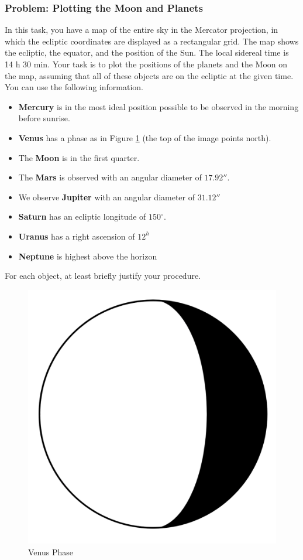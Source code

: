 \documentclass[a4paper,12pt]{extarticle}
\begin{document}
\subsubsection{Problem: Plotting the Moon and Planets}
\begin{multicols}{2}
	
In this task, you have a map of the entire sky in the Mercator projection, in which the ecliptic coordinates are displayed as a rectangular grid. The map shows the ecliptic, the equator, and the position of the Sun. The local sidereal time is 14 h 30 min. Your task is to plot the positions of the planets and the Moon on the map, assuming that all of these objects are on the ecliptic at the given time. You can use the following information.
	
	\begin{itemize}
		\itemsep0em 
		\item \textbf{Mercury} is in the most ideal position possible to be observed in the morning before sunrise.
		\item \textbf{Venus} has a phase as in Figure \ref{venus1} (the top of the image points north).
		\item The \textbf{Moon} is in the first quarter.
		\item The \textbf{Mars} is observed with an angular diameter of $17.92''$.
		\item We observe \textbf{Jupiter} with an angular diameter of $31.12''$
		\item \textbf{Saturn} has an ecliptic longitude of $150^\circ$.
		\item \textbf{Uranus} has a right ascension of $12^h$
		\item \textbf{Neptune} is highest above the horizon
	\end{itemize}
	For each object, at least briefly justify your procedure.
	
	\begin{figure}[H]
		\centering
		\includegraphics[width=0.4\linewidth]{venus_phase.png}
		\caption{Venus Phase}
		\label{venus1}
	\end{figure}
\end{multicols}
\end{document}
